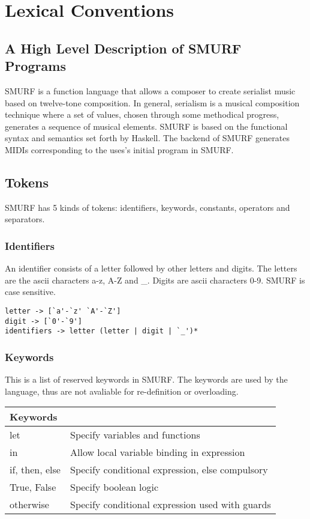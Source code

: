 \section{Lexical Conventions}
\subsection{A High Level Description of SMURF Programs}
SMURF is a function language that allows a composer to create serialist music
based on twelve-tone composition. In general, serialism is a musical composition
technique where a set of values, chosen through some methodical progress,
          generates a sequence of musical elements. SMURF is based on the
          functional syntax and semantics set forth by Haskell. The backend of
          SMURF generates MIDIs corresponding to the uses's initial program in
          SMURF. 

\subsection{Tokens}
SMURF has 5 kinds of tokens: identifiers, keywords, constants, operators and separators.

\subsubsection{Identifiers}
\label{sec:identifiers}
An identifier consists of a letter followed by other letters and
digits. The letters are the ascii characters a-z, A-Z and \_. Digits are ascii
characters 0-9. SMURF is case sensitive.
\begin{verbatim}
letter -> [`a'-`z' `A'-`Z']
digit -> [`0'-`9']
identifiers -> letter (letter | digit | `_')*
\end{verbatim}

\subsubsection{Keywords}
This is a list of reserved keywords in SMURF. The keywords are used by the
language, thus are not avaliable for re-definition or overloading.
\begin{table} [H]
	\centering
    \begin{tabular}{ll}
    \hline\hline
    Keywords & \\ 
    \hline\hline
      let & Specify variables and functions  \\ \hline
      in & Allow local variable binding in expression \\ \hline
      if, then, else & Specify conditional expression, else compulsory  \\ \hline
      True, False & Specify boolean logic \\ \hline
      otherwise & Specify conditional expression used with guards \\ \hline 
    \end{tabular}
\end{table}


